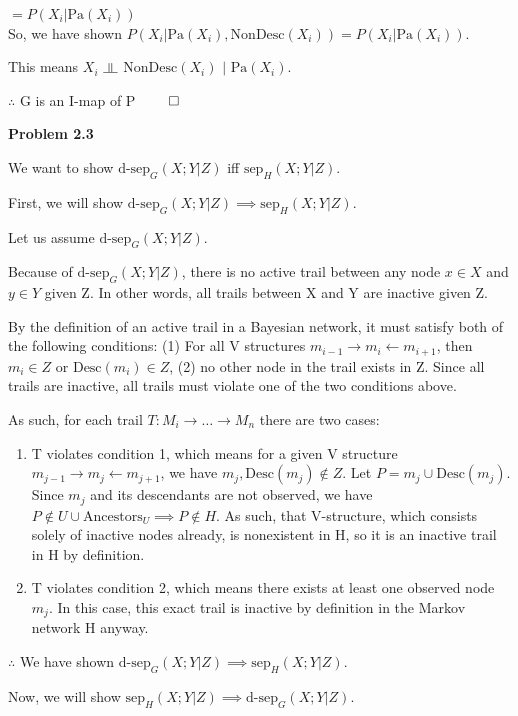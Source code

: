 \documentclass[12pt]{article}
\newcommand{\indep}{\rotatebox[origin=c]{90}{$\models$}}
\begin{document}
$= P(X_i \vert \text{Pa}(X_i))$ \\

So, we have shown $P(X_i \vert \text{Pa}(X_i), \text{NonDesc}(X_i)) = P(X_i \vert \text{Pa}(X_i))$.

This means $X_i$ $\indep$ $\text{NonDesc}(X_i)$ $\vert$ $\text{Pa}(X_i)$.

$\therefore$ G is an I-map of P $\qed$

\pagebreak\textbf{Problem 2.3}

We want to show $\text{d-sep}_G(X; Y \vert Z)$ iff $\text{sep}_H(X; Y \vert Z)$.

First, we will show $\text{d-sep}_G(X; Y \vert Z) \implies \text{sep}_H(X; Y \vert Z)$.

Let us assume $\text{d-sep}_G(X; Y \vert Z)$.

Because of $\text{d-sep}_G(X; Y \vert Z)$, there is no active trail between any node $x\in X$ and $y\in Y$ given Z. In other words, all trails between X and Y are inactive given Z.

By the definition of an active trail in a Bayesian network, it must satisfy both of the following conditions: (1) For all V structures $m_{i-1} \rightarrow m_i \leftarrow m_{i+1}$, then $m_i\in Z$ or $\text{Desc}(m_i)\in Z$, (2) no other node in the trail exists in Z. Since all trails are inactive, all trails must violate one of the two conditions above. 

As such, for each trail $T : M_i \rightarrow \dots \rightarrow M_n$ there are two cases:
\begin{enumerate}
	\item T violates condition 1, which means for a given V structure $m_{j-1} \rightarrow m_j \leftarrow m_{j+1}$, we have $m_j, \text{Desc}(m_j)\notin Z$. Let $P = m_j \cup \text{Desc}(m_j)$. Since $m_j$ and its descendants are not observed, we have $P \notin U \cup \text{Ancestors}_U \implies P \notin H$. As such, that V-structure, which consists solely of inactive nodes already, is nonexistent in H, so it is an inactive trail in H by definition.
	\item T violates condition 2, which means there exists at least one observed node $m_j$. In this case, this exact trail is inactive by definition in the Markov network H anyway.
\end{enumerate}

$\therefore$ We have shown $\text{d-sep}_G(X; Y \vert Z) \implies \text{sep}_H(X; Y \vert Z)$.

Now, we will show $\text{sep}_H(X; Y \vert Z) \implies \text{d-sep}_G(X; Y \vert Z)$.
\end{document}
